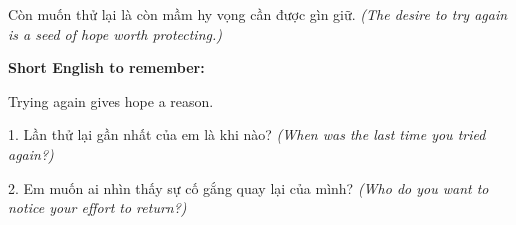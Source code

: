 \begin{baihoc}
Còn muốn thử lại là còn mầm hy vọng cần được gìn giữ.
\textit{(The desire to try again is a seed of hope worth protecting.)}
\end{baihoc}

\begin{ghinhoanh}
\textbf{Short English to remember:}

Trying again gives hope a reason.

\end{ghinhoanh}

\begin{tuhocnhanh}
1. Lần thử lại gần nhất của em là khi nào? \textit{(When was the last time you tried again?)}

2. Em muốn ai nhìn thấy sự cố gắng quay lại của mình? \textit{(Who do you want to notice your effort to return?)}
\end{tuhocnhanh}
\ngancach